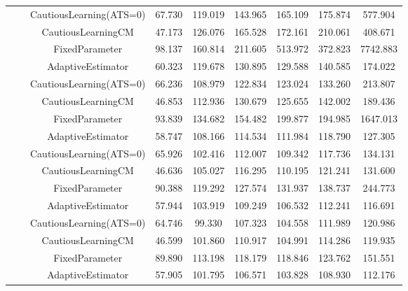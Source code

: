 \begin{table}[!h]
\begin{tabular}[t]{ccccccccc}
 &  & CautiousLearning(ATS=0) & 67.730 & 119.019 & 143.965 & 165.109 & 175.874 & 577.904\\

 &  & CautiousLearningCM & 47.173 & 126.076 & 165.528 & 172.161 & 210.061 & 408.671\\

 & \multirow[t]{-4}{*}{\centering\arraybackslash 0.35} & FixedParameter & 98.137 & 160.814 & 211.605 & 513.972 & 372.823 & 7742.883\\
\cmidrule{2-9}
 &  & AdaptiveEstimator & 60.323 & 119.678 & 130.895 & 129.588 & 140.585 & 174.022\\

 &  & CautiousLearning(ATS=0) & 66.236 & 108.979 & 122.834 & 123.024 & 133.260 & 213.807\\

 &  & CautiousLearningCM & 46.853 & 112.936 & 130.679 & 125.655 & 142.002 & 189.436\\

 & \multirow[t]{-4}{*}{\centering\arraybackslash 0.50} & FixedParameter & 93.839 & 134.682 & 154.482 & 199.877 & 194.985 & 1647.013\\
\cmidrule{2-9}
 &  & AdaptiveEstimator & 58.747 & 108.166 & 114.534 & 111.984 & 118.790 & 127.305\\

 &  & CautiousLearning(ATS=0) & 65.926 & 102.416 & 112.007 & 109.342 & 117.736 & 134.131\\

 &  & CautiousLearningCM & 46.636 & 105.027 & 116.295 & 110.195 & 121.241 & 131.600\\

 & \multirow[t]{-4}{*}{\centering\arraybackslash 0.75} & FixedParameter & 90.388 & 119.292 & 127.574 & 131.937 & 138.737 & 244.773\\
\cmidrule{2-9}
 &  & AdaptiveEstimator & 57.944 & 103.919 & 109.249 & 106.532 & 112.241 & 116.691\\

 &  & CautiousLearning(ATS=0) & 64.746 & 99.330 & 107.323 & 104.558 & 111.989 & 120.986\\

 &  & CautiousLearningCM & 46.599 & 101.860 & 110.917 & 104.991 & 114.286 & 119.935\\

 & \multirow[t]{-4}{*}{\centering\arraybackslash 1.00} & FixedParameter & 89.890 & 113.198 & 118.179 & 118.846 & 123.762 & 151.551\\
\cmidrule{2-9}
 &  & AdaptiveEstimator & 57.905 & 101.795 & 106.571 & 103.828 & 108.930 & 112.176\\


\end{tabular}
\end{table}
